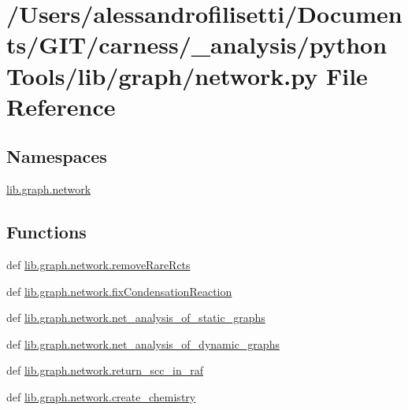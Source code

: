 \hypertarget{a00090}{\section{/\-Users/alessandrofilisetti/\-Documents/\-G\-I\-T/carness/\-\_\-analysis/python\-Tools/lib/graph/network.py File Reference}
\label{a00090}
}
\subsection*{Namespaces}
\begin{DoxyCompactItemize}
\item 
\hyperlink{a00140}{lib.\-graph.\-network}
\end{DoxyCompactItemize}
\subsection*{Functions}
\begin{DoxyCompactItemize}
\item 
def \hyperlink{a00140_aa023644e6dad3ed7be55a592d8576007}{lib.\-graph.\-network.\-remove\-Rare\-Rcts}
\item 
def \hyperlink{a00140_a31099e87728bb8b899360bb641bb6b64}{lib.\-graph.\-network.\-fix\-Condensation\-Reaction}
\item 
def \hyperlink{a00140_a47be50a907814919f86f8313927d3236}{lib.\-graph.\-network.\-net\-\_\-analysis\-\_\-of\-\_\-static\-\_\-graphs}
\item 
def \hyperlink{a00140_ab2528d394362bfca89834b72d8024e6f}{lib.\-graph.\-network.\-net\-\_\-analysis\-\_\-of\-\_\-dynamic\-\_\-graphs}
\item 
def \hyperlink{a00140_a5c4fdcb64dea8b366645ad27dc71bff8}{lib.\-graph.\-network.\-return\-\_\-scc\-\_\-in\-\_\-raf}
\item 
def \hyperlink{a00140_a22ad63e3d10c613dc181b9e69ad1cef5}{lib.\-graph.\-network.\-create\-\_\-chemistry}
\end{DoxyCompactItemize}
